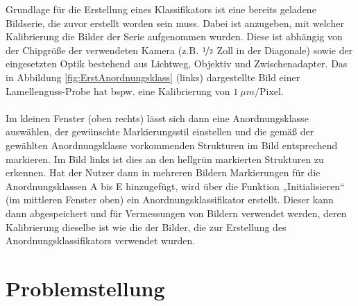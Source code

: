 \documentclass[
fontsize=10pt, 
listof = totoc,
parskip = half	
]{report}
\begin{document}
\noindent Grundlage für die Erstellung eines Klassifikators ist eine bereits geladene Bildserie, die zuvor erstellt worden sein muss. Dabei ist anzugeben, mit welcher Kalibrierung  die Bilder der Serie aufgenommen wurden. Diese ist abhängig von der Chipgröße der verwendeten Kamera (z.B. $\nicefrac{1}{2}$ Zoll in der Diagonale)  sowie der eingesetzten Optik bestehend aus Lichtweg, Objektiv und Zwischenadapter. Das in Abbildung \ref{fig:ErstAnordnungsklass} (links) dargestellte Bild einer Lamellenguss-Probe hat bspw. eine Kalibrierung von $1~\mu m/\text{Pixel}$. 
\\\\
Im kleinen Fenster (oben rechts) lässt sich dann eine Anordnungsklasse auswählen, der gewünschte Markierungsstil einstellen und die gemäß der gewählten Anordnungsklasse vorkommenden Strukturen im Bild entsprechend markieren. Im Bild links ist dies an den hellgrün markierten Strukturen zu erkennen. Hat der Nutzer dann in mehreren Bildern Markierungen für die Anordnungsklassen A bis E hinzugefügt, wird über die Funktion „Initialisieren“ (im mittleren Fenster oben) ein Anordnungsklassifikator erstellt. Dieser kann dann abgespeichert und für Vermessungen von Bildern verwendet werden, deren Kalibrierung dieselbe ist wie die der Bilder, die zur Erstellung des Anordnungsklassifikators verwendet wurden. 

\section{Problemstellung}
\label{sec:Problemstellung}
\end{document}
